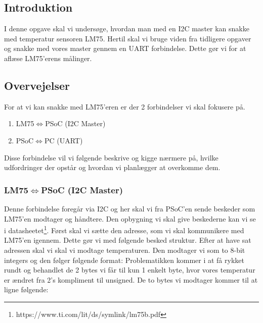\documentclass[../main.tex]{subfiles}
\begin{document}
\subsection{Introduktion}
I denne opgave skal vi undersøge, hvordan man med en I2C master kan snakke med temperatur sensoren LM75.
Hertil skal vi bruge viden fra tidligere opgaver og snakke med vores master gennem en UART forbindelse. 
Dette gør vi for at aflæse LM75'erens målinger.

\subsection{Overvejelser}
For at vi kan snakke med LM75'eren er der 2 forbindelser vi skal fokusere på.
\begin{enumerate}
    \item LM75$\iff$PSoC (I2C Master)
    \item PSoC$\iff$PC (UART)
\end{enumerate}
Disse forbindelse vil vi følgende beskrive og kigge nærmere på, hvilke udfordringer der opstår og hvordan vi planlægger at overkomme dem.

\subsubsection{LM75$\iff$PSoC (I2C Master)} \label{sec:i2cmaster}
Denne forbindelse foregår via I2C og her skal vi fra PSoC'en sende beskeder som LM75'en modtager og håndtere. Den opbygning vi skal give beskederne kan vi se i datasheetet\footnote{https://www.ti.com/lit/ds/symlink/lm75b.pdf}.
Først skal vi sætte den adresse, som vi skal kommunikere med LM75'en igennem. Dette gør vi med følgende besked struktur.
Efter at have sat adressen skal vi skal vi modtage temperaturen. Den modtager vi som to 8-bit integers og den følger følgende format:
Problematikken kommer i at få rykket rundt og behandlet de 2 bytes vi får til kun 1 enkelt byte, hvor vores temperatur er ændret fra 2's kompliment til unsigned.
De to bytes vi modtager kommer til at ligne følgende:
\end{document}
